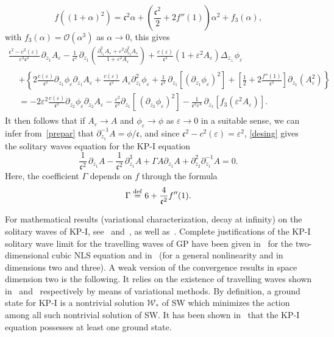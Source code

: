 \documentclass[AHL,Unicode,longabstracts,published]{cedram}
\newcommand*\p{\partial}
\newcommand*\ddef{\stackrel{\rm def}{=}}
\newcommand*\BO{\mathcal{O}}
\newcommand*\BW{\mathcal{W}}
\newcommand*\cs{{\mathfrak c}}
\newcommand*\e{\varepsilon}
\renewcommand*\a{\alpha}
\newcommand*\G{\Gamma}
\begin{document}
\begin{equation}\label{Taylor_NL}
f\left((1+ \a)^2 \right) = \cs^2 \a + \left(\frac{\cs^2}{2} + 2 f''(1) \right) \a^2 + f_3(\a),
\end{equation}
with $ f_3(\a) = \BO(\a^3) $ as $\a \to 0 $, this gives
\begin{multline}\label{desing}
\frac{\cs^2 - c^2(\e) }{\e^2 \cs^2} \, \p_{z_1} A_\e - \frac{1}{\cs^2} \, \p_{z_1} \left(
\frac{\p_{z_1}^2 A_\e + \e^2 \p^2_{z_2} A_\e}{1 + \e^2 A_\e} \right) + \frac{c(\e) }{\cs^2} \left(1 + \e^2 A_\e\right) \Delta_{z_\perp} \phi_\e
\\ 
\begin{aligned}
& +
\left\{ 2 \frac{c(\e)}{\cs^2} \p_{z_1} \phi_\e \p_{z_1} A_\e + \frac{c(\e)}{\cs^2}\, A_\e \p^2_{z_1} \phi_\e + \frac{1}{\cs^2} \, \p_{z_1} \left[(\p_{z_1} \phi_\e)^2\right] + \left[\frac{1}{2} + 2 \frac{f''(1)}{\cs^2} \right]
\p_{z_1} \left(A_\e^2\right) \right\} \\
& = - 2 \e^2 \frac{c(\e)}{\cs^2} \p_{z_2} \phi_\e \p_{z_2} A_\e - \frac{\e^2}{\cs^2} \p_{z_1} \left[\, (\p_{z_2} \phi_\e)^2\right] - \frac{1}{\cs^2 \e^4}\, \p_{z_1} \left[f_3\left(\e^2 A_\e\right)\right].
\end{aligned}
\end{multline}
It then follows that if $A_\e \to A$ and $\phi_\e \to \phi $ as $\e \to 0$ in a suitable sense, we can infer from~\eqref{prepar} that $\p_{z_1}^{-1} A = \phi/\cs$, and since $\cs^2 - c^2(\e) = \e^2$, \eqref{desing} gives the solitary waves equation for the KP-I equation
\begin{equation}
\tag{SW}
\frac{1}{\cs^2}\, \p_{z_1} A - \frac{1}{\cs^2} \, \p^3_{z_1} A + \G A \p_{z_1} A + \p_{z_2}^2 \p_{z_1}^{-1} A = 0.
\end{equation} Here, the coefficient $\G$ depends on $f$ through the formula
\[
\G \ddef 6 + \frac{4}{\cs^2} f''(1).
\]

For mathematical results (variational characterization, decay at infinity) on the solitary waves of KP-I, see~\cite{dBSIHP} and~\cite{dBS}, as well as~\cite{WangWillem96}. Complete justifications of the KP-I solitary wave limit for the travelling waves of GP have been given in~\cite{BGStranso2d} for the two-dimensional cubic NLS equation and in~\cite{CMraref} (for a general nonlinearity and in dimensions two and three). A weak version of the convergence results in space dimension two is the following. It relies on the existence of travelling waves shown in~\cite{BGS2} and~\cite{CM1} respectively by means of variational methods. By definition, a ground state for KP-I is a nontrivial solution $ \BW_* $ of SW which minimizes the action among all such nontrivial solution of SW. It has been shown in~\cite[Lemma~2.1]{dBS} that the KP-I equation possesses at least one ground state.
\end{document}
